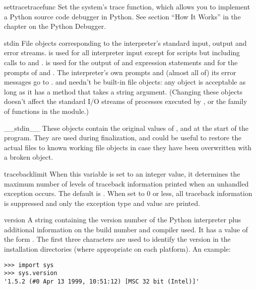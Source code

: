 \begin{funcdesc}{settrace}{tracefunc}
  Set the system's trace function, which allows you to implement a
  Python source code debugger in Python.  See section ``How It Works''
  in the chapter on the Python Debugger.
\end{funcdesc}

\begin{datadesc}{stdin}
  File objects corresponding to the interpreter's standard input,
  output and error streams.   is used for all
  interpreter input except for scripts but including calls to
   and
  .   is used
  for the output of  and expression statements and for the
  prompts of  and .  The interpreter's
  own prompts and (almost all of) its error messages go to
  .   and  needn't
  be built-in file objects: any object is acceptable as long as it has
  a  method that takes a string argument.  (Changing these
  objects doesn't affect the standard I/O streams of processes
  executed by ,  or the
   family of functions in the  module.)
\end{datadesc}

\begin{datadesc}{__stdin__}
These objects contain the original values of ,
 and  at the start of the program.  They are 
used during finalization, and could be useful to restore the actual
files to known working file objects in case they have been overwritten
with a broken object.
\end{datadesc}

\begin{datadesc}{tracebacklimit}
When this variable is set to an integer value, it determines the
maximum number of levels of traceback information printed when an
unhandled exception occurs.  The default is .  When set to
0 or less, all traceback information is suppressed and only the
exception type and value are printed.
\end{datadesc}

\begin{datadesc}{version}
A string containing the version number of the Python interpreter plus
additional information on the build number and compiler used.  It has
a value of the form .  The first
three characters are used to identify the version in the installation
directories (where appropriate on each platform).  An example:

\begin{verbatim}
>>> import sys
>>> sys.version
'1.5.2 (#0 Apr 13 1999, 10:51:12) [MSC 32 bit (Intel)]'
\end{verbatim}
\end{datadesc}

